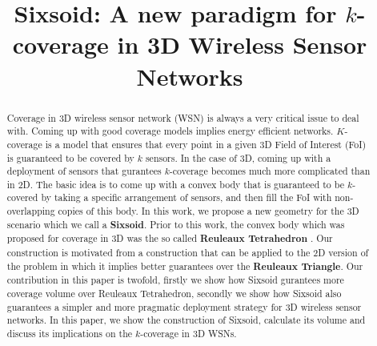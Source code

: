 \documentclass[conference]{IEEEtran}
\begin{document}
\title{Sixsoid: A new paradigm for $k$-coverage in 3D Wireless Sensor Networks}


\author{
\and
{}
}












\maketitle


\begin{abstract}
Coverage in 3D wireless sensor network (WSN) is always a very critical issue to deal with. Coming up with good coverage models implies energy efficient networks. $K$-coverage is a model that ensures that every point in a given 3D Field of Interest (FoI) is guaranteed to be covered by $k$ sensors. In the case of 3D, coming up with a deployment of sensors that gurantees $k$-coverage becomes much more complicated than in 2D. The basic idea is to come up with a convex body that is guaranteed to be $k$-covered by taking a specific arrangement of sensors, and then fill the FoI with non-overlapping copies of this body.  
In this work, we propose a new geometry for the 3D scenario which we call a \textbf{Sixsoid}. Prior to this work, the convex body  which
was proposed for coverage in 3D was the so called \textbf{Reuleaux Tetrahedron} \cite{A, AD1}. Our construction is motivated from a construction that can be applied to the 2D version of  the problem \cite{MS} in which it implies better guarantees over the \textbf{Reuleaux Triangle}.  Our contribution in this paper is twofold, firstly we show how Sixsoid gurantees more coverage volume over Reuleaux Tetrahedron, secondly we show how Sixsoid also guarantees a simpler and more pragmatic deployment strategy for 3D wireless sensor networks. In this paper, we show the construction of Sixsoid, calculate its volume and discuss its implications on the $k$-coverage in 3D WSNs.
\end{abstract}
\end{document}
